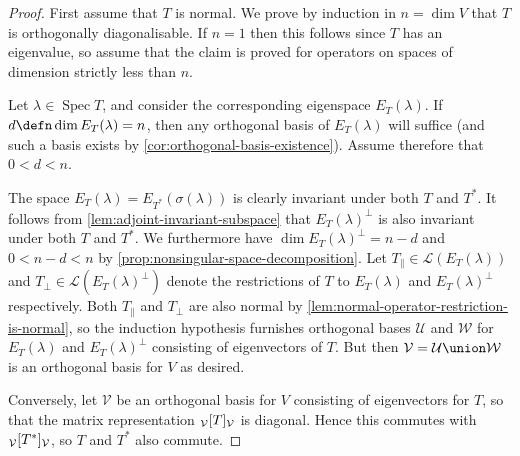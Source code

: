 \documentclass[a4paper, 11pt]{memoir}
\DeclareMathOperator{\spec}{Spec}
\theoremstyle{plaincustomnumber}
\theoremstyle{changedotbreakcustomnumber}
\newcommand{\calL}{\mathcal{L}}
\newcommand{\calV}{\mathcal{V}}
\newcommand{\calW}{\mathcal{W}}
\newcommand{\calU}{\mathcal{U}}
\begin{document}
\begin{proof}
    First assume that $T$ is normal. We prove by induction in $n = \dim V$ that $T$ is orthogonally diagonalisable. If $n = 1$ then this follows since $T$ has an eigenvalue, so assume that the claim is proved for operators on spaces of dimension strictly less than $n$.

    Let $\lambda \in \spec T$, and consider the corresponding eigenspace $E_T(\lambda)$. If $d \defn \dim E_T(\lambda) = n$, then any orthogonal basis of $E_T(\lambda)$ will suffice (and such a basis exists by \cref{cor:orthogonal-basis-existence}). Assume therefore that $0 < d < n$.

    The space $E_T(\lambda) = E_{T^*}(\sigma(\lambda))$ is clearly invariant under both $T$ and $T^*$. It follows from \cref{lem:adjoint-invariant-subspace} that $E_T(\lambda)^\perp$ is also invariant under both $T$ and $T^*$. We furthermore have $\dim E_T(\lambda)^\perp = n-d$ and $0 < n-d < n$ by \cref{prop:nonsingular-space-decomposition}. Let $T_\parallel \in \calL(E_T(\lambda))$ and $T_\perp \in \calL(E_T(\lambda)^\perp)$ denote the restrictions of $T$ to $E_T(\lambda)$ and $E_T(\lambda)^\perp$ respectively. Both $T_\parallel$ and $T_\perp$ are also normal by \cref{lem:normal-operator-restriction-is-normal}, so the induction hypothesis furnishes orthogonal bases $\calU$ and $\calW$ for $E_T(\lambda)$ and $E_T(\lambda)^\perp$ consisting of eigenvectors of $T$. But then $\calV = \calU \union \calW$ is an orthogonal basis for $V$ as desired.

    Conversely, let $\calV$ be an orthogonal basis for $V$ consisting of eigenvectors for $T$, so that the matrix representation $\mr{\calV}{T}{\calV}$ is diagonal. Hence this commutes with $\mr{\calV}{T^*}{\calV}$, so $T$ and $T^*$ also commute.
\end{proof}



\end{document}
